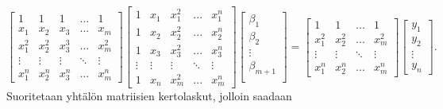 \documentclass[12pt,a4paper,titlepage]{article}
\begin{document}
\begin{equation*} 
	\begin{bmatrix}
		1       & 1       & 1 & ...    & 1 \\
		x_{1} & x_{2} &  x_3 &...    &  x_{m}\\
		x_{1}^2 & x_{2}^2 & x_3^3 & ...    &  x_{m}^2\\
		\vdots  & \vdots  & \vdots & \ddots & \vdots  \\
		x_{1}^n & x_{2}^n & x_3^n &   ... & x_{m}^n
	\end{bmatrix}
	\begin{bmatrix}
			1 & x_{1} & x_{1}^2 & ...    & x_{1}^n \\
			1  & x_{2}& x_{2}^2 & ...    & x_{2}^n \\
			1  & x_{3}& x_{3}^2 & ...    & x_{3}^n \\
			\vdots  & \vdots  & \vdots & \ddots & \vdots  \\
			1  & x_{n}& x_{m}^2 &    ... & x_{m}^n
	\end{bmatrix}
	\begin{bmatrix}
		\beta_1 \\
		\beta_2 \\
		\vdots \\
		\beta_{m+1} \\
	\end{bmatrix}
	=
	\begin{bmatrix}
		1       & 1       & ...    & 1 \\
		x_{1}^2 & x_{2}^2 & ...    &  x_{m}^2\\
		\vdots  & \vdots  & \ddots & \vdots  \\
		x_{1}^n & x_{2}^n &    ... & x_{m}^n
	\end{bmatrix}
	\begin{bmatrix}
		y_1 \\
		y_2 \\
		\vdots \\
		y_n
	\end{bmatrix}.
\end{equation*}
Suoritetaan yhtälön matriisien kertolaskut, jolloin saadaan
\end{document}
